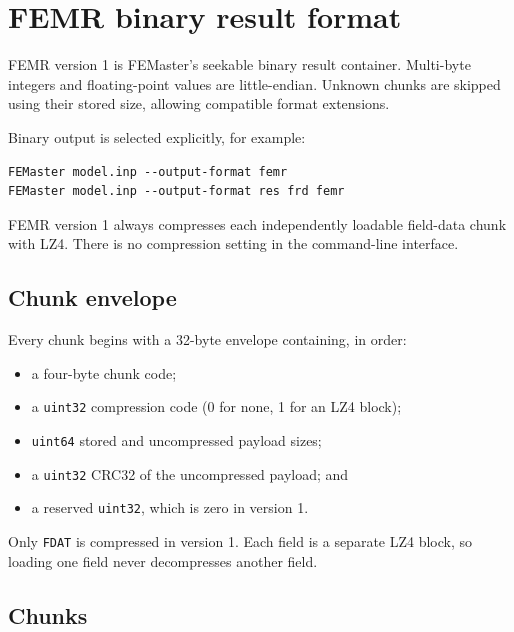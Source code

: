 \section{FEMR binary result format}
\label{sec:femr-format}

FEMR version 1 is FEMaster's seekable binary result container. Multi-byte
integers and floating-point values are little-endian. Unknown chunks are
skipped using their stored size, allowing compatible format extensions.

Binary output is selected explicitly, for example:
\begin{verbatim}
FEMaster model.inp --output-format femr
FEMaster model.inp --output-format res frd femr
\end{verbatim}
FEMR version 1 always compresses each independently loadable field-data chunk
with LZ4. There is no compression setting in the command-line interface.

\subsection{Chunk envelope}

Every chunk begins with a 32-byte envelope containing, in order:
\begin{itemize}
  \item a four-byte chunk code;
  \item a \texttt{uint32} compression code (0 for none, 1 for an LZ4 block);
  \item \texttt{uint64} stored and uncompressed payload sizes;
  \item a \texttt{uint32} CRC32 of the uncompressed payload; and
  \item a reserved \texttt{uint32}, which is zero in version 1.
\end{itemize}
Only \texttt{FDAT} is compressed in version 1. Each field is a separate LZ4
block, so loading one field never decompresses another field.

\subsection{Chunks}

